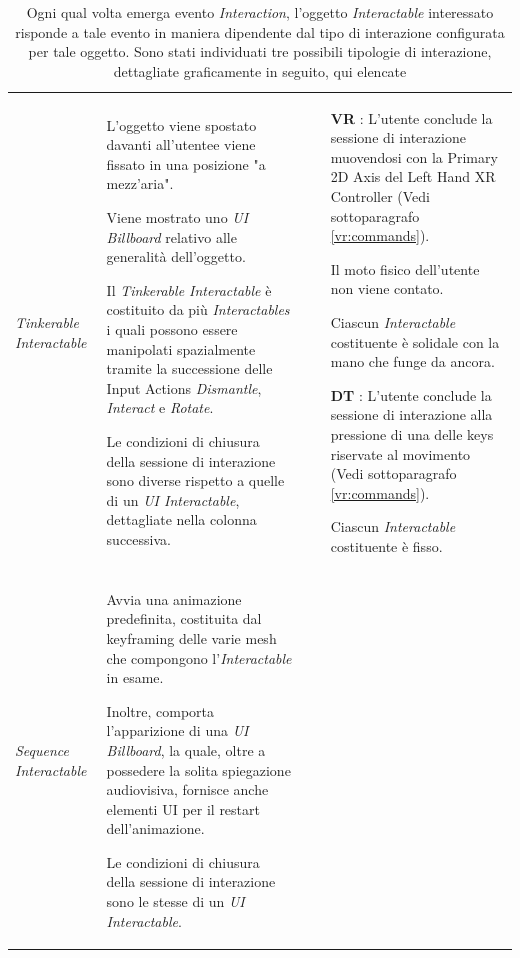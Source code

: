 \documentclass[10pt, openany]{article}
\begin{document}
\begin{landscape}
\begin{table}[h!]
\begin{tabular}{@{} p{0.15\paperheight} p{0.3\paperheight} p{0.25\paperheight} @{}}
        \textit{Tinkerable Interactable} & 
        L'oggetto viene spostato davanti all'utente\footnotemark[4] e viene fissato in una posizione "a mezz'aria".\par
        Viene mostrato uno \textit{UI Billboard} relativo alle generalit\`a dell'oggetto.\par
        Il \textit{Tinkerable Interactable} \`e costituito da pi\`u \textit{Interactables} i quali possono essere manipolati spazialmente tramite la successione delle 
        Input Actions \textit{Dismantle}, \textit{Interact} e \textit{Rotate}\footnotemark[5].\par
        Le condizioni di chiusura della sessione di interazione sono diverse rispetto a quelle di un \textit{UI Interactable}, dettagliate nella colonna successiva.
        & \begin{itemize}[topsep=0pt, noitemsep]
          \item[\textbf{VR}]: L'utente conclude la sessione di interazione muovendosi con la Primary 2D Axis del Left Hand XR Controller (Vedi sottoparagrafo \ref{vr:commands}).\par
          Il moto fisico dell'utente non viene contato.\par
          Ciascun \textit{Interactable} costituente \`e solidale con la mano che funge da ancora.
          \item[\textbf{DT}]: L'utente conclude la sessione di interazione alla pressione di una delle keys riservate al movimento (Vedi sottoparagrafo \ref{vr:commands}).\par
          Ciascun \textit{Interactable} costituente \`e fisso.
        \end{itemize} \\
        
        \textit{Sequence Interactable} & 
        Avvia una animazione predefinita, costituita dal keyframing delle varie mesh che compongono l'\textit{Interactable} in esame.\par
        Inoltre, comporta l'apparizione di una \textit{UI Billboard}\footnotemark[6], 
        la quale, oltre a possedere la solita spiegazione audiovisiva, fornisce anche elementi UI per il restart dell'animazione.\par
        Le condizioni di chiusura della sessione di interazione sono le stesse di un \textit{UI Interactable}.
        & \\

        \bottomrule
      \end{tabular}
      \caption{Ogni qual volta emerga evento \textit{Interaction}, l'oggetto \textit{Interactable} interessato risponde a tale evento in maniera dipendente dal tipo
        di interazione configurata per tale oggetto.
        Sono stati individuati tre possibili tipologie di interazione, dettagliate graficamente in seguito, qui elencate}
    \end{table}
    \end{landscape}
\end{document}
